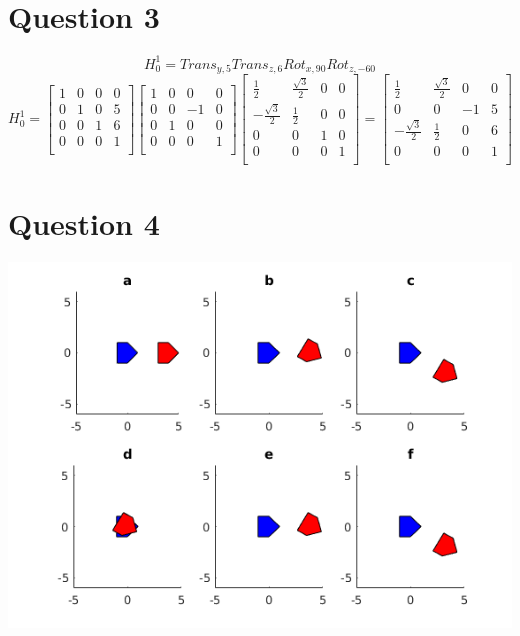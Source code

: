 \documentclass[11pt]{article}
\begin{document}
\section{Question 3}
$$
H^1_0 = Trans_{y,5}Trans_{z,6}Rot_{x,90}Rot_{z,-60}
$$
$$
H^1_0 =
\begin{bmatrix}
    1 & 0 & 0 & 0 \\
    0 & 1 & 0 & 5 \\
    0 & 0 & 1 & 6 \\
    0 & 0 & 0 & 1 \\
\end{bmatrix}
\begin{bmatrix}
    1 & 0 & 0 & 0 \\
    0 & 0 & -1& 0 \\
    0 & 1 & 0 & 0 \\
    0 & 0 & 0 & 1 \\
\end{bmatrix}      
\begin{bmatrix}
    \frac{1}{2} & \frac{\sqrt{3}}{2} & 0 & 0 \\
    -\frac{\sqrt{3}}{2}  & \frac{1}{2} & 0 & 0 \\
    0 & 0 & 1 & 0 \\
    0 & 0 & 0 & 1 \\
\end{bmatrix}
=
\begin{bmatrix}
    \frac{1}{2} & \frac{\sqrt{3}}{2} & 0 & 0 \\
    0 & 0 & -1 & 5 \\
    -\frac{\sqrt{3}}{2}  & \frac{1}{2} & 0 & 6 \\
    0 & 0 & 0 & 1 \\
\end{bmatrix}
$$
\section{Question 4}
\includegraphics{p4.png}
\end{document}
